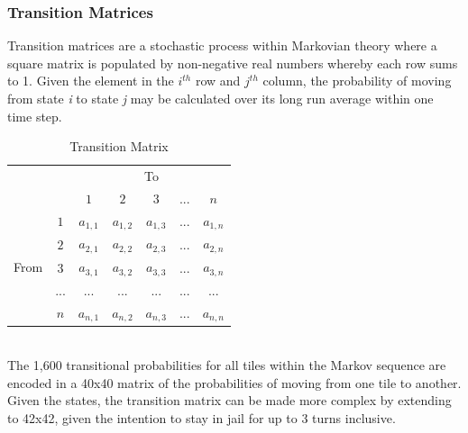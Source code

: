 \documentclass[12pt]{article}
\begin{document}
\subsubsection{Transition Matrices}
Transition matrices are a stochastic process within Markovian theory where a square matrix is populated by non-negative real numbers whereby each row sums to 1. Given the element in the $i^{th}$ row and $j^{th}$ column, the probability of moving from state \emph{i} to state \emph{j} may be calculated over its long run average within one time step.\cite{snellj}
\begin{table}[h]
\centering
\label{Transition Matrix}
\begin{tabular}{ccccccc}
                                           &                        & \multicolumn{5}{c}{To}                                                                                                     \\ \cline{3-7} 
                                           & \multicolumn{1}{c|}{}  & \multicolumn{1}{c|}{$1$} & \multicolumn{1}{c|}{$2$} & \multicolumn{1}{c|}{$3$} & \multicolumn{1}{c|}{...} & \multicolumn{1}{c|}{$n$} \\ \cline{2-7} 
\multicolumn{1}{c|}{\multirow{5}{*}{From}} & \multicolumn{1}{c|}{$1$} & \multicolumn{1}{c|}{$a_{1,1}$}  & \multicolumn{1}{c|}{$a_{1,2}$}  & \multicolumn{1}{c|}{$a_{1,3}$}  & \multicolumn{1}{c|}{...}  & \multicolumn{1}{c|}{$a_{1,n}$}  \\ \cline{2-7} 
\multicolumn{1}{c|}{}                      & \multicolumn{1}{c|}{$2$} & \multicolumn{1}{c|}{$a_{2,1}$}  & \multicolumn{1}{c|}{$a_{2,2}$}  & \multicolumn{1}{c|}{$a_{2,3}$}  & \multicolumn{1}{c|}{...}  & \multicolumn{1}{c|}{$a_{2,n}$}  \\ \cline{2-7} 
\multicolumn{1}{c|}{}                      & \multicolumn{1}{c|}{$3$} & \multicolumn{1}{c|}{$a_{3,1}$}  & \multicolumn{1}{c|}{$a_{3,2}$}  & \multicolumn{1}{c|}{$a_{3,3}$}  & \multicolumn{1}{c|}{...}  & \multicolumn{1}{c|}{$a_{3,n}$}  \\ \cline{2-7} 
\multicolumn{1}{c|}{}                      & \multicolumn{1}{c|}{...} & \multicolumn{1}{c|}{...}  & \multicolumn{1}{c|}{...}  & \multicolumn{1}{c|}{...}  & \multicolumn{1}{c|}{...}  & \multicolumn{1}{c|}{...}  \\ \cline{2-7} 
\multicolumn{1}{c|}{}                      & \multicolumn{1}{c|}{$n$} & \multicolumn{1}{c|}{$a_{n,1}$}  & \multicolumn{1}{c|}{$a_{n,2}$}  & \multicolumn{1}{c|}{$a_{n,3}$}  & \multicolumn{1}{c|}{...}  & \multicolumn{1}{c|}{$a_{n,n}$}  \\ \cline{2-7} 
\end{tabular}
\caption{Transition Matrix}
\end{table}
\\
The 1,600 transitional probabilities for all tiles within the Markov sequence are encoded in a 40x40 matrix of the probabilities of moving from one tile to another. Given the states, the transition matrix can be made more complex by extending to 42x42, given the intention to stay in jail for up to 3 turns inclusive.
\end{document}
